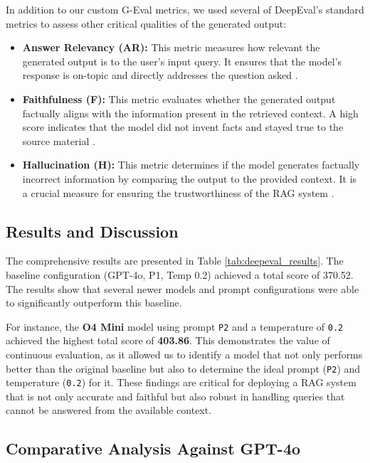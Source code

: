 In addition to our custom G-Eval metrics, we used several of DeepEval's standard metrics to assess other critical qualities of the generated output:
\begin{itemize}
    \item \textbf{Answer Relevancy (AR):} This metric measures how relevant the generated output is to the user's input query. It ensures that the model's response is on-topic and directly addresses the question asked \autocite{deepeval2023}.
    \item \textbf{Faithfulness (F):} This metric evaluates whether the generated output factually aligns with the information present in the retrieved context. A high score indicates that the model did not invent facts and stayed true to the source material \autocite{deepeval2023}.
    \item \textbf{Hallucination (H):} This metric determines if the model generates factually incorrect information by comparing the output to the provided context. It is a crucial measure for ensuring the trustworthiness of the RAG system \autocite{deepeval2023}.
\end{itemize}


\subsection{Results and Discussion}
The comprehensive results are presented in Table \ref{tab:deepeval_results}. The baseline configuration (GPT-4o, P1, Temp 0.2) achieved a total score of 370.52. The results show that several newer models and prompt configurations were able to significantly outperform this baseline.

For instance, the \textbf{O4 Mini} model using prompt \texttt{P2} and a temperature of \texttt{0.2} achieved the highest total score of \textbf{403.86}. This demonstrates the value of continuous evaluation, as it allowed us to identify a model that not only performs better than the original baseline but also to determine the ideal prompt (\texttt{P2}) and temperature (\texttt{0.2}) for it. These findings are critical for deploying a RAG system that is not only accurate and faithful but also robust in handling queries that cannot be answered from the available context.



\subsection{Comparative Analysis Against GPT-4o}
\label{sec:comparative_analysis_gpt4o}

